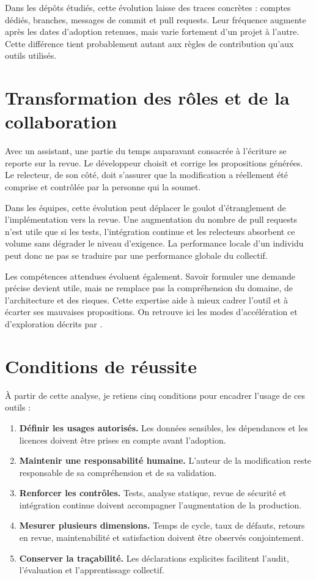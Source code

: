 \documentclass[12pt,a4paper,oneside]{report}
\begin{document}
Dans les dépôts étudiés, cette évolution laisse des traces concrètes : comptes dédiés, branches, messages de commit et pull requests. Leur fréquence augmente après les dates d'adoption retenues, mais varie fortement d'un projet à l'autre. Cette différence tient probablement autant aux règles de contribution qu'aux outils utilisés.

\section{Transformation des rôles et de la collaboration}

Avec un assistant, une partie du temps auparavant consacrée à l'écriture se reporte sur la revue. Le développeur choisit et corrige les propositions générées. Le relecteur, de son côté, doit s'assurer que la modification a réellement été comprise et contrôlée par la personne qui la soumet.

Dans les équipes, cette évolution peut déplacer le goulot d'étranglement de l'implémentation vers la revue. Une augmentation du nombre de pull requests n'est utile que si les tests, l'intégration continue et les relecteurs absorbent ce volume sans dégrader le niveau d'exigence. La performance locale d'un individu peut donc ne pas se traduire par une performance globale du collectif.

Les compétences attendues évoluent également. Savoir formuler une demande précise devient utile, mais ne remplace pas la compréhension du domaine, de l'architecture et des risques. Cette expertise aide à mieux cadrer l'outil et à écarter ses mauvaises propositions. On retrouve ici les modes d'accélération et d'exploration décrits par \textcite{barke2023grounded}.

\section{Conditions de réussite}

À partir de cette analyse, je retiens cinq conditions pour encadrer l'usage de ces outils :
\begin{enumerate}
  \item \textbf{Définir les usages autorisés.} Les données sensibles, les dépendances et les licences doivent être prises en compte avant l'adoption.
  \item \textbf{Maintenir une responsabilité humaine.} L'auteur de la modification reste responsable de sa compréhension et de sa validation.
  \item \textbf{Renforcer les contrôles.} Tests, analyse statique, revue de sécurité et intégration continue doivent accompagner l'augmentation de la production.
  \item \textbf{Mesurer plusieurs dimensions.} Temps de cycle, taux de défauts, retours en revue, maintenabilité et satisfaction doivent être observés conjointement.
  \item \textbf{Conserver la traçabilité.} Les déclarations explicites facilitent l'audit, l'évaluation et l'apprentissage collectif.
\end{enumerate}
\end{document}
